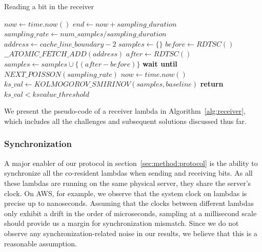 \begin{algorithm}[!t]
  \caption{Reading a bit in the receiver}
  \label{alg:receiver}
  \begin{algorithmic}[1]
  \STATE $now \leftarrow  time.now()$
  \STATE $end \leftarrow now + sampling\_duration$
  \STATE $sampling\_rate \leftarrow num\_samples / sampling\_duration$
  \STATE $address \leftarrow cache\_line\_boundary-2$
  \STATE $samples \leftarrow \{\} $
      \STATE $before \leftarrow RDTSC()$
      \STATE $\_\_ATOMIC\_FETCH\_ADD(address)$
      \STATE $after \leftarrow RDTSC()$
      \STATE $samples \leftarrow samples \cup \{(after-before)\}$
      \STATE \textbf{wait until} $NEXT\_POISSON(sampling\_rate)$
      \STATE $now \leftarrow  time.now()$
  \ENDWHILE
  \STATE $ks\_val \leftarrow KOLMOGOROV\_SMIRINOV(samples, baseline)$
  \STATE \textbf{return} $ks\_val < ksvalue\_threshold$
  \end{algorithmic}
  \end{algorithm}

We present the pseudo-code of a receiver lambda in Algorithm~\ref{alg:receiver},
which includes all the challenges and subsequent solutions discussed thus
far.

\subsubsection{Synchronization} 
A major enabler of our protocol in section~\ref{sec:method:protocol} is the ability 
to synchronize all the co-resident lambdas when sending and receiving 
bits. As all these lambdas are running on the same physical
server, they share the server's clock. On AWS, for example, we observe that the
system clock on lambdas is precise up to nanoseconds. 
Assuming that the clocks between different lambdas only exhibit a drift in the order
of microseconds, sampling at a millisecond scale should provide us a margin for
synchronization mismatch. Since we do not observe any synchronization-related
noise in our results, we believe that this is a reasonable assumption.


